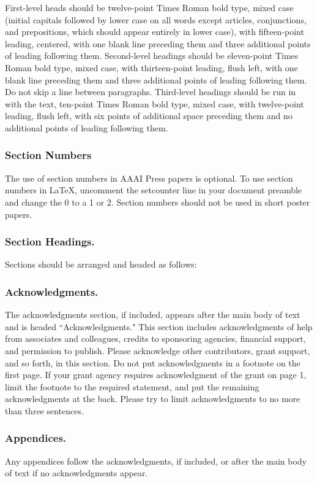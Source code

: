 \documentclass[letterpaper]{article}
\begin{document}
First-level heads should be twelve-point Times Roman bold type, mixed case (initial capitals followed by lower case on all words except articles, conjunctions, and prepositions, which should appear entirely in lower case), with fifteen-point leading, centered, with one blank line preceding them and three additional points of leading following them. Second-level headings should be eleven-point Times Roman bold type, mixed case, with thirteen-point leading, flush left, with one blank line preceding them and three additional points of leading following them. Do not skip a line between paragraphs. Third-level headings should be run in with the text, ten-point Times Roman bold type, mixed case, with twelve-point leading, flush left, with six points of additional space preceding them and no additional points of leading following them.

\subsubsection{Section Numbers}
The use of section numbers in AAAI Press papers is optional. To use section numbers in \LaTeX{}, uncomment the setcounter line in your document preamble and change the 0 to a 1 or 2. Section numbers should not be used in short poster papers.

\subsubsection{Section Headings.}
Sections should be arranged and headed as follows: 

\subsubsection{Acknowledgments.}
The acknowledgments section, if included, appears after the main body of text and is headed ``Acknowledgments." This section includes acknowledgments of help from associates and colleagues, credits to sponsoring agencies, financial support, and permission to publish. Please acknowledge other contributors, grant support, and so forth, in this section. Do not put acknowledgments in a footnote on the first page. If your grant agency requires acknowledgment of the grant on page 1, limit the footnote to the required statement, and put the remaining acknowledgments at the back. Please try to limit acknowledgments to no more than three sentences. 

\subsubsection{Appendices.}
Any appendices follow the acknowledgments, if included, or after the main body of text if no acknowledgments appear. 
\end{document}
